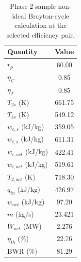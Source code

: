 \begin{table}[htbp]
    \centering
    \caption{Phase 2 sample non-ideal Brayton-cycle calculation at the selected efficiency pair.}
    \label{tab:phase2_sample_calculation}
    \begin{tabular}{lc}
        \hline
        Quantity & Value \\
        \hline
        $r_p$ & 60.00 \\
        $\eta_C$ & 0.85 \\
        $\eta_T$ & 0.85 \\
        $T_{2s}$ (K) & 661.75 \\
        $T_{4s}$ (K) & 549.12 \\
        $w_{c,s}$ (kJ/kg) & 359.05 \\
        $w_{t,s}$ (kJ/kg) & 611.31 \\
        $w_{c,act}$ (kJ/kg) & 422.41 \\
        $w_{t,act}$ (kJ/kg) & 519.61 \\
        $T_{2,act}$ (K) & 718.30 \\
        $q_{in}$ (kJ/kg) & 426.97 \\
        $w_{net}$ (kJ/kg) & 97.20 \\
        $\dot{m}$ (kg/s) & 23.421 \\
        $\dot{W}_{net}$ (MW) & 2.276 \\
        $\eta_{th}$ (\%) & 22.76 \\
        BWR (\%) & 81.29 \\
        \hline
    \end{tabular}
\end{table}